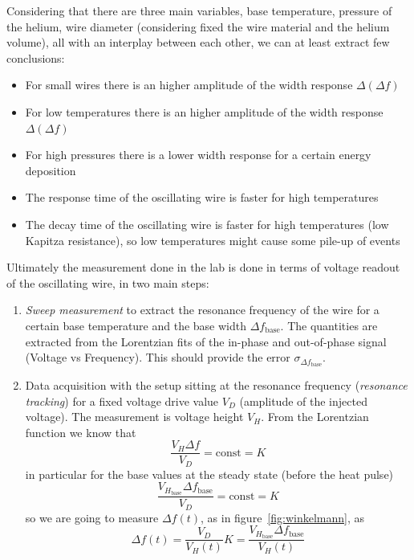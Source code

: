 \documentclass[a4paper,12pt]{article}
\begin{document}
Considering that there are three main variables, base temperature, pressure of the helium, wire diameter (considering fixed the wire material and the helium volume), all with an interplay between each other, we can at least extract few conclusions:
\begin{itemize}
  \item For small wires there is an higher amplitude of the width response $\Delta (\Delta f)$
  \item For low temperatures there is an higher amplitude of the width response $\Delta (\Delta f)$
  \item For high pressures there is a lower width response for a certain energy deposition
  \item The response time of the oscillating wire is faster for high temperatures 
  \item The decay time of the oscillating wire is faster for high temperatures (low Kapitza resistance), so low temperatures might cause some pile-up of events

\end{itemize}

Ultimately the measurement done in the lab is done in terms of voltage readout of the oscillating wire, in two main steps:
\begin{enumerate}

  \item \textit{Sweep measurement} to extract the resonance frequency of the wire for a certain base temperature and the base width $\Delta f_\mathrm{base}$. The quantities are extracted from the Lorentzian fits of the in-phase and out-of-phase signal (Voltage vs Frequency). This should provide the error $\sigma_{\Delta f_\mathrm{base}}$.
  \item Data acquisition with the setup sitting at the resonance frequency (\textit{resonance tracking}) for a fixed voltage drive value $V_D$ (amplitude of the injected voltage). The measurement is voltage height $V_H$. From the Lorentzian function we know that
  \begin{equation}
    \frac{V_H\Delta f}{V_D} = \mathrm{const} = K
  \end{equation}
in particular for the base values at the steady state (before the heat pulse)
  \begin{equation}
    \frac{V_{H_\mathrm{base}}\Delta f_\mathrm{base}}{V_D} = \mathrm{const} = K
  \end{equation}
so we are going to measure $\Delta f(t)$, as in figure~\ref{fig:winkelmann}, as
  \begin{equation}
    \Delta f(t) = \frac{V_D}{V_H(t)}K = \frac{V_{H_\mathrm{base}} \Delta f_\mathrm{base}}{V_H(t)}
  \end{equation}
  
\end{enumerate}
\end{document}
